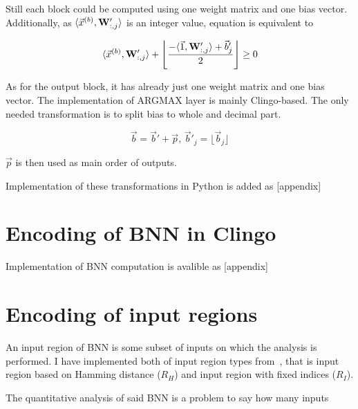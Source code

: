 \documentclass{fithesis}
\begin{document}
Still each block could be computed using one weight matrix and one bias vector.
Additionally, as $\langle\vec x^{(b)}, \mathbf{W}'_{:, j}\rangle$ is an integer value,
equation is equivalent to

\begin{equation*}
    \langle \vec x^{(b)}, \mathbf{W}'_{:, j}\rangle + \left\lfloor \frac{- \langle\vec1, \mathbf{W}'_{:,j}\rangle + \vec b'_j}{2} \right\rfloor \geq 0\\
\end{equation*}

As for the output block, it has already just one weight matrix and one bias
vector. The implementation of ARGMAX layer is mainly Clingo-based.
The only needed transformation is to split bias to whole and decimal part.

\begin{equation*}
    \vec b = \vec b' + \vec p, \, \vec b'_j = \lfloor \vec b_j \rfloor
\end{equation*}

$\vec p$ is then used as main order of outputs.

Implementation of these transformations in Python is added as [appendix] %

\section{Encoding of BNN in Clingo}

Implementation of BNN computation is avalible as [appendix] %

\section{Encoding of input regions}

An input region of BNN is some subset of inputs on which the analysis is
performed. I have implemented both of input region types from~\cite{10.1145/3563212},
that is input region based on Hamming distance ($R_H$) and input region with
fixed indices ($R_I$).

The quantitative analysis of said BNN is a problem to say how many inputs


\end{document}
